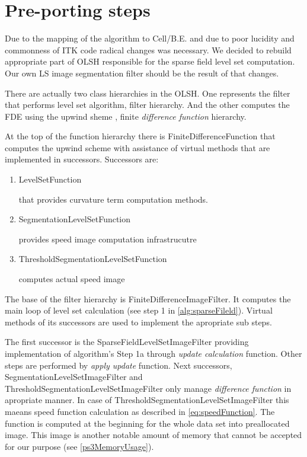 \section{Pre-porting steps}
\par
Due to the mapping of the algorithm to Cell/B.E. and due to poor lucidity and commonness of ITK code radical changes was necessary.
We decided to rebuild appropriate part of OLSH responsible for the sparse field level set computation.
Our own LS image segmentation filter should be the result of that changes.

\par
There are actually two class hierarchies in the OLSH.
One represents the filter that performs level set algorithm, filter hierarchy.
And the other computes the FDE using the upwind sheme \cite{sethianLS}, finite \emph{difference function} hierarchy.

\par
At the top of the function hierarchy there is FiniteDifferenceFunction that computes the upwind scheme with assistance of virtual methods that are implemented in successors.
Successors are:
\begin{enumerate}
  \item{LevelSetFunction}
  \par
  that provides curvature term computation methods.

\item{SegmentationLevelSetFunction}
\par
provides speed image computation infrastrucutre

\item{ThresholdSegmentationLevelSetFunction}
\par
computes actual speed image
\end{enumerate}

\par
The base of the filter hierarchy is FiniteDifferenceImageFilter.
It computes the main loop of level set calculation (see step 1 in \ref{alg:sparseFileld}).
Virtual methods of its successors are used to implement the apropriate sub steps.

\par
The first successor is the SparseFieldLevelSetImageFilter providing implementation of algorithm's Step 1a through \emph{update calculation} function.
Other steps are performed by \emph{apply update} function.
Next successors, SegmentationLevelSetImageFilter and ThresholdSegmentationLevelSetImageFilter only manage \emph{difference function} in apropriate manner.
In case of ThresholdSegmentationLevelSetImageFilter this maeans speed function calculation as described in \ref{eq:speedFunction}.
The function is computed at the beginning for the whole data set into preallocated image.
This image is another notable amount of memory that cannot be accepted for our purpose (see \ref{ps3MemoryUsage}).

